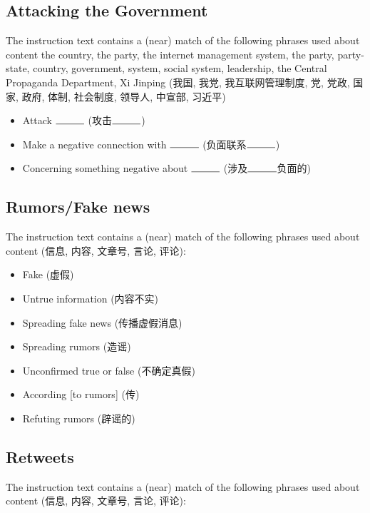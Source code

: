 \documentclass[12pt]{article}
\begin{document}
\begin{CJK*}{UTF8}{gbsn}
\subsection{Attacking the Government}

The instruction text contains a (near) match of the following phrases used about content the country, the party, the internet management system, the party, party-state, country, government, system, social system, leadership, the Central Propaganda Department, Xi Jinping (我国, 我党, 我互联网管理制度, 党, 党政, 国家, 政府, 体制, 社会制度, 领导人, 中宣部, 习近平)

\begin{itemize}[noitemsep]
	\item Attack $\rule{1cm}{0.15mm}$ (攻击$\rule{1cm}{0.15mm}$)
	\item Make a negative connection with $\rule{1cm}{0.15mm}$ (负面联系$\rule{1cm}{0.15mm}$)
	\item Concerning something negative about $\rule{1cm}{0.15mm}$ (涉及$\rule{1cm}{0.15mm}$负面的)
\end{itemize}


\subsection{Rumors/Fake news}

The instruction text contains a (near) match of the following phrases used about content (信息, 内容, 文章号, 言论, 评论):

\begin{itemize}[noitemsep]
	\item Fake (虚假)
	\item Untrue information (内容不实)
	\item Spreading fake news (传播虚假消息)
	\item Spreading rumors (造谣)
	\item Unconfirmed true or false (不确定真假)
	\item According [to rumors] (传)
	\item Refuting rumors (辟谣的)
\end{itemize}

\subsection{Retweets}

The instruction text contains a (near) match of the following phrases used about content (信息, 内容, 文章号, 言论, 评论):


\end{CJK*}
\end{document}
